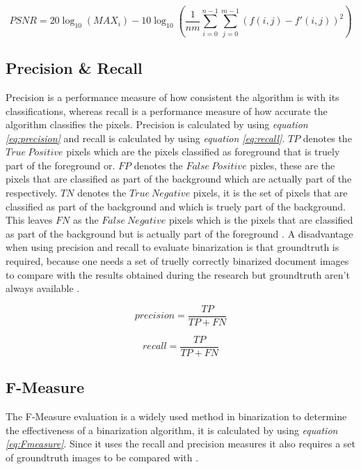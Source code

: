 \documentclass[11pt]{article}
\begin{document}
		\begin{large}
		\begin{equation}\label{eq:psnr}
		 \displaystyle{PSNR = \displaystyle20\log_{10}(MAX_i) - 10 \log_{10}(\displaystyle\frac{1}{nm}\sum_{i=0}^{n-1}\sum_{j=0}^{m-1}(f(i,j)-f'(i,j))^2)}
		\end{equation}
		\end{large}

		\subsection{Precision \& Recall}
		Precision is a performance measure of how consistent the algorithm is with its classifications, whereas recall is a performance measure of how accurate the algorithm classifies the pixels. Precision is calculated by using \textit{equation \ref{eq:precision}} and recall is calculated by using \textit{equation \ref{eq:recall}}. $TP$ denotes the $True\ Positive$ pixels which are the pixels classified as foreground that is truely part of the foreground or. $FP$ denotes the $False\ Positive$ pixles, these are the pixels that are classified as part of the background which are actually part of the respectively. $TN$ denotes the $True\ Negative$ pixels, it is the set of pixels that are classified as part of the background and which is truely part of the background. This leaves $FN$ as the $False\ Negative$ pixels which is the pixels that are classified as part of the background but is actually part of the foreground \cite{fawcett2006introduction}. A disadvantage when using precision and recall to evaluate binarization is that groundtruth is required, because one needs a set of truelly correctly binarized document images to compare with the results obtained during the research but groundtruth aren't always available \cite{ntirogiannis2013performance}.

		\begin{large}
		\begin{equation} \label{eq:precision}
		precision = \frac{TP}{TP + FN}
		\end{equation}
		\end{large}

		\begin{large}
		\begin{equation} \label{eq:recall}
		recall = \frac{TP}{TP + FN}
		\end{equation}
		\end{large}

		\subsection{F-Measure}
			The F-Measure evaluation is a widely used method in binarization to determine the effectiveness of a binarization algorithm, it is calculated by using \textit{equation \ref{eq:Fmeasure}}. Since it uses the recall and precision measures it also requires a set of groundtruth images to be compared with \cite{ntirogiannis2008objective}.
\end{document}
